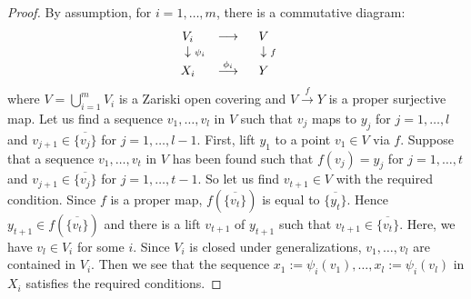 \documentclass[11pt,a4paper]{amsart}
\theoremstyle{definition}
\theoremstyle{remark}
\begin{document}
\begin{proof}
By assumption, for $i = 1,\ldots,m$, there is a commutative diagram:
\[
\begin{array}{ccccc}
V_i & {\longrightarrow} & V &\\
\hphantom{\scriptstyle \psi_i}\downarrow{\scriptstyle \psi_i} &&  \hphantom{\scriptstyle f}\downarrow{\scriptstyle f}
& & \\
X_i & \stackrel{\phi_i}{\longrightarrow} & Y\\
\end{array}
\]
where $V=\bigcup_{i=1}^m V_i$ is a Zariski open covering and $V \xrightarrow{f} Y$ is a proper surjective map. 
Let us find a sequence $v_1,\ldots,v_l$ in $V$ such that $v_j$ maps to $y_j$ for $j = 1, \ldots, l$ and $v_{j+1} \in \overline{\{v_j\}}$
for $j = 1, \ldots, l-1$. 
First, lift $y_1$ to a point $v_1 \in V$ via $f$. 
Suppose that a sequence $v_1,\ldots,v_t$ in $V$ has been found such that $f(v_j) = y_j$ for $j = 1, \ldots, t$ and $v_{j+1} \in \overline{\{v_j\}}$ for $j=1,\ldots,t-1$. 
So let us find $v_{t+1} \in V$ with the required condition. 
Since $f$ is a proper map, $f(\overline{\{v_t\}})$ is equal to $\overline{\{y_t\}}$. Hence $y_{t+1} \in f(\overline{\{v_t\}})$ and there is a lift $v_{t+1}$ of $y_{t+1}$ such that $v_{t+1} \in \overline{\{v_t\}}$. 
Here, we have $v_l \in V_i$ for some $i$. 
Since $V_i$ is closed under generalizations, $v_1,\ldots,v_l$ are contained in $V_i$. Then we see that the sequence $x_1:=\psi_i(v_1),\ldots,x_l:=\psi_i(v_l)$ in $X_i$ satisfies the required conditions.
\end{proof}
\end{document}
